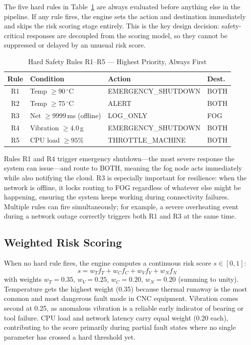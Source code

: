 \documentclass[conference]{IEEEtran}
\begin{document}
The five hard rules in Table~\ref{tab:rules} are always evaluated
before anything else in the pipeline.
If any rule fires, the engine sets the action and destination
immediately and skips the risk scoring stage entirely.
This is the key design decision: safety-critical responses are
decoupled from the scoring model, so they cannot be suppressed or
delayed by an unusual risk score.

\begin{table}[t]
\caption{Hard Safety Rules R1--R5 --- Highest Priority, Always First}
\label{tab:rules}
\centering
\small
\setlength{\tabcolsep}{4pt}
\begin{tabular}{@{}clll@{}}
\toprule
\textbf{Rule} & \textbf{Condition} & \textbf{Action} & \textbf{Dest.} \\
\midrule
R1 & Temp $\geq 90\,^\circ$C            & EMERGENCY\_SHUTDOWN & BOTH \\
R2 & Temp $\geq 75\,^\circ$C            & ALERT               & BOTH \\
R3 & Net $\geq 9999$\,ms (offline)      & LOG\_ONLY            & FOG  \\
R4 & Vibration $\geq 4.0\,$g            & EMERGENCY\_SHUTDOWN & BOTH \\
R5 & CPU load $\geq 95\%$               & THROTTLE\_MACHINE   & BOTH \\
\bottomrule
\end{tabular}
\end{table}

Rules R1 and R4 trigger emergency shutdown---the most severe response
the system can issue---and route to BOTH, meaning the fog node acts
immediately while also notifying the cloud.
R3 is especially important for resilience: when the network is offline,
it locks routing to FOG regardless of whatever else might be happening,
ensuring the system keeps working during connectivity failures.
Multiple rules can fire simultaneously; for example, a severe
overheating event during a network outage correctly triggers both R1
and R3 at the same time.

\subsection{Weighted Risk Scoring}

When no hard rule fires, the engine computes a continuous risk score
$s \in [0,1]$:
\begin{equation}
  s = w_T f_T + w_C f_C + w_V f_V + w_N f_N
  \label{eq:score}
\end{equation}
with weights $w_T{=}0.35$, $w_V{=}0.25$, $w_C{=}0.20$,
$w_N{=}0.20$ (summing to unity).
Temperature gets the highest weight (0.35) because thermal runaway
is the most common and most dangerous fault mode in CNC equipment.
Vibration comes second at 0.25, as anomalous vibration is a reliable
early indicator of bearing or tool failure.
CPU load and network latency carry equal weight (0.20 each),
contributing to the score primarily during partial fault states where
no single parameter has crossed a hard threshold yet.
\end{document}
